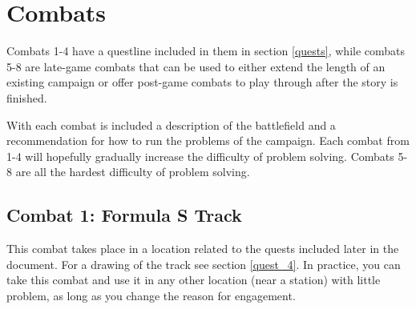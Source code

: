 \documentclass[a4paper]{article}
\begin{document}

\newpage

\section{Combats} \label{combats}

Combats 1-4 have a questline included in them in section \ref{quests}, while combats 5-8 are late-game combats that can be used to either extend the length of an existing campaign or offer post-game combats to play through after the story is finished.

With each combat is included a description of the battlefield and a recommendation for how to run the problems of the campaign. Each combat from 1-4 will hopefully gradually increase the difficulty of problem solving. Combats 5-8 are all the hardest difficulty of problem solving.

\subsection{Combat 1: Formula S Track} \label{combat_1}

This combat takes place in a location related to the quests included later in the document. For a drawing of the track see section \ref{quest_4}. In practice, you can take this combat and use it in any other location (near a station) with little problem, as long as you change the reason for engagement.
\end{document}
